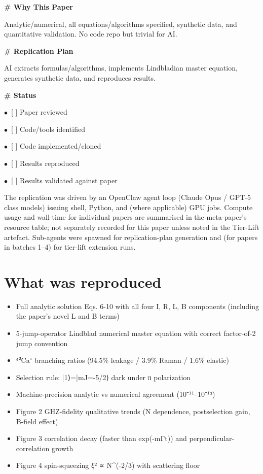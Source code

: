 \documentclass[11pt]{article}
\begin{document}
\par\medskip\textbf{\# Why This Paper}\par
Analytic/numerical, all equations/algorithms specified, synthetic data, and quantitative validation. No code repo but trivial for AI.

\par\medskip\textbf{\# Replication Plan}\par
AI extracts formulas/algorithms, implements Lindbladian master equation, generates synthetic data, and reproduces results.

\par\medskip\textbf{\# Status}\par
\par$\bullet$\ [ ] Paper reviewed
\par$\bullet$\ [ ] Code/tools identified
\par$\bullet$\ [ ] Code implemented/cloned
\par$\bullet$\ [ ] Results reproduced
\par$\bullet$\ [ ] Results validated against paper
\normalsize

The replication was driven by an OpenClaw agent loop (Claude Opus / GPT-5 class models) issuing shell, Python, and (where applicable) GPU jobs. Compute usage and wall-time for individual papers are summarised in the meta-paper's resource table; not separately recorded for this paper unless noted in the Tier-Lift artefact. Sub-agents were spawned for replication-plan generation and (for papers in batches 1--4) for tier-lift extension runs.

\section{What was reproduced}
\begin{itemize}
\item Full analytic solution Eqs. 6-10 with all four I, R, L, B components (including the paper's novel L and B terms)
\item 5-jump-operator Lindblad numerical master equation with correct factor-of-2 jump convention
\item ⁴⁰Ca⁺ branching ratios (94.5\% leakage / 3.9\% Raman / 1.6\% elastic)
\item Selection rule: |1⟩=|mJ=-5/2⟩ dark under π polarization
\item Machine-precision analytic vs numerical agreement (10⁻¹¹–10⁻¹³)
\item Figure 2 GHZ-fidelity qualitative trends (N dependence, postselection gain, B-field effect)
\item Figure 3 correlation decay (faster than exp(-mΓt)) and perpendicular-correlation growth
\item Figure 4 spin-squeezing ξ² ∝ N\textasciicircum{}(-2/3) with scattering floor
\end{itemize}
\end{document}
